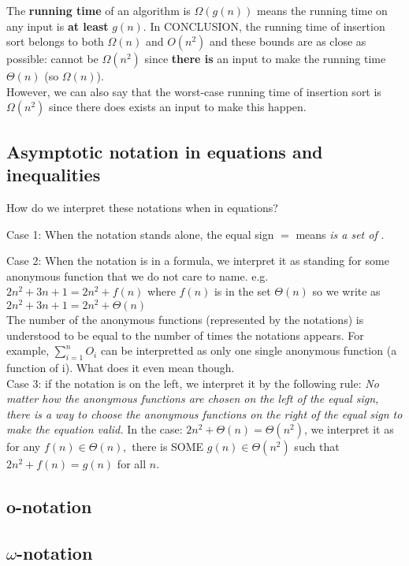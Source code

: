 \documentclass{article}
\begin{document}
 The \textbf{running time} of an algorithm is $\Omega(g(n))$ means the running time on any input is \textbf{at least} $g(n)$. In CONCLUSION, the running time of insertion sort belongs to both $\Omega(n)$ and $O(n^2)$ and these bounds are as close as possible: cannot be $\Omega(n^2)$ since \textbf{there is} an input to make the running time $\Theta(n)$ (so $\Omega(n)$).\\
 
 However, we can also say that the worst-case running time of insertion sort is $\Omega(n^2)$ since there does exists an input to make this happen.
 
 
\subsection*{Asymptotic notation in equations and inequalities}
How do we interpret these notations when in equations?

Case 1: When the notation stands alone, the equal sign $=$ means \textit{is a set of }. 

Case 2: When the notation is in a formula, we interpret it as standing for some anonymous function that we do not care to name. e.g. $2n^2+3n+1 = 2n^2+f(n)$ where $f(n)$ is in the set $\Theta(n)$ so we write as $2n^2+3n+1 = 2n^2+\Theta(n)$\\

The number of the anonymous functions (represented by the notations) is understood to be equal to the number of times the notations appears. For example, $\sum_{i=1}^{n}O_i$ can be interpretted as only one single anonymous function (a function of i). {\color{red} What does it even mean though.}\\

Case 3: if the notation is on the left, we interpret it by the following rule:
\textit{No matter how the anonymous
functions are chosen on the left of the equal sign, there is a way to choose
the anonymous functions on the right of the equal sign to make the equation valid. } In the case: $2n^2 +\Theta(n) = \Theta(n^2)$, we interpret it as for any $f(n)\in \Theta(n), $ there is SOME $g(n) \in \Theta(n^2)$ such that $2n^2 +f(n) = g(n)$ for all $n$.
\subsection*{o-notation}


\subsection*{$\omega$-notation}
\end{document}
